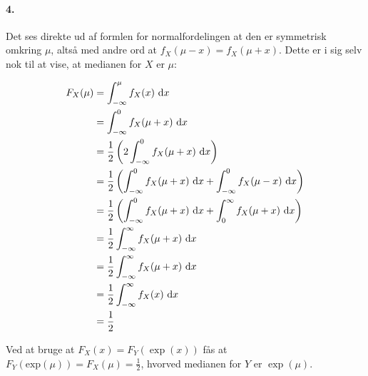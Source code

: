 \paragraph{4.} Det ses direkte ud af formlen for normalfordelingen at den er
symmetrisk omkring $\mu$, altså med andre ord at $f_X(\mu - x) = f_X(\mu + x)$.
Dette er i sig selv nok til at vise, at medianen for $X$ er $\mu$:

\begin{align*}
F_X(\mu) &= \int_{-\infty}^\mu f_X(x)\ \mathrm{d} x \\
&=\int_{-\infty}^0 f_X(\mu + x)\ \mathrm{d} x \\
&=\frac{1}{2}\left(2\int_{-\infty}^0 f_X(\mu + x)\ \mathrm{d} x\right) \\
&=\frac{1}{2}\left(\int_{-\infty}^0 f_X(\mu + x)\ \mathrm{d} x + \int_{-\infty}^0 f_X(\mu - x)\ \mathrm{d} x\right) \\
&=\frac{1}{2}\left(\int_{-\infty}^0 f_X(\mu + x)\ \mathrm{d} x + \int_0^\infty f_X(\mu + x)\ \mathrm{d} x\right) \\
&=\frac{1}{2}\int_{-\infty}^\infty f_X(\mu + x)\ \mathrm{d} x \\
&=\frac{1}{2}\int_{-\infty}^\infty f_X(\mu + x)\ \mathrm{d} x \\
&=\frac{1}{2}\int_{-\infty}^\infty f_X(x)\ \mathrm{d} x \\
&=\frac{1}{2}
\end{align*}

Ved at bruge at $F_X(x) = F_Y(\exp(x))$ fås at $F_Y(\mathrm{exp}(\mu))
= F_X(\mu) = \frac{1}{2}$, hvorved medianen for $Y$ er $\exp(\mu)$.
